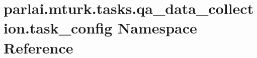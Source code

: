\hypertarget{namespaceparlai_1_1mturk_1_1tasks_1_1qa__data__collection_1_1task__config}{}\section{parlai.\+mturk.\+tasks.\+qa\+\_\+data\+\_\+collection.\+task\+\_\+config Namespace Reference}
\label{namespaceparlai_1_1mturk_1_1tasks_1_1qa__data__collection_1_1task__config}
